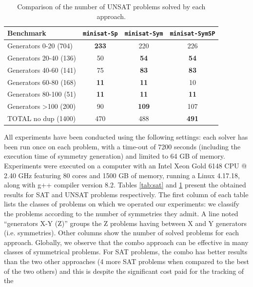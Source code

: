 \begin{table}\footnotesize
 \centering
 \begin{tabular}{l|ccc}
  \toprule
  Benchmark  &\texttt{minisat-Sp} & \texttt{minisat-Sym} & \texttt{minisat-SymSP}\\
  \hline 
  Generators 0-20 (704) & \cellcolor{gray!30,}\textbf{233}&220&226\\
  Generators 20-40 (136) & 50&\cellcolor{gray!30}\textbf{54}&\cellcolor{gray!30}\textbf{54}\\
  Generators 40-60 (141) & 75&\cellcolor{gray!30}\textbf{83}&\cellcolor{gray!30}\textbf{83}\\
  Generators 60-80 (168) & \cellcolor{gray!30}\textbf{11}&\cellcolor{gray!30}\textbf{11}&10\\
  Generators 80-100 (51) & \cellcolor{gray!30}\textbf{11}&\cellcolor{gray!30}\textbf{11}&\cellcolor{gray!30}\textbf{11}\\
  Generators \textgreater100 (200) & 90&\cellcolor{gray!30,}\textbf{109}&107\\
  \hline 
  TOTAL no dup (1400) & 470&488&\cellcolor{gray!30,}\textbf{491}\\
  \bottomrule
 \end{tabular}
 \caption{Comparison of the number of UNSAT problems solved by each approach.}
 \label{tab:unsat}
\end{table}
All experiments have been conducted using the following settings: each solver
has been run once on each problem, with a time-out of 7200 seconds (including
the execution time of symmetry generation) and limited to 64 GB of memory.
Experiments were executed on a computer with an Intel Xeon Gold 6148 CPU
@ 2.40 GHz featuring 80 cores and 1500 GB of memory, running a Linux 4.17.18,
along with g++ compiler version 8.2.
Tables \ref{tab:sat} and \ref{tab:unsat} present the obtained results for SAT
and UNSAT problems respectively. The first column of each table lists the
classes of problems on which we operated our experiments: we classify the
problems according to the number of symmetries they admit. A line noted
``generators X-Y (Z)'' groups the Z problems having between X and Y generators
(i.e. symmetries). Other columns show the number of solved problems for each
approach.
Globally, we observe that the combo approach can be effective in many classes
of symmetrical problems. For SAT problems, the combo has better results than the
two other approaches (4 more SAT problems when compared to the best of the two
others) and this is despite the significant cost paid for the tracking of the
